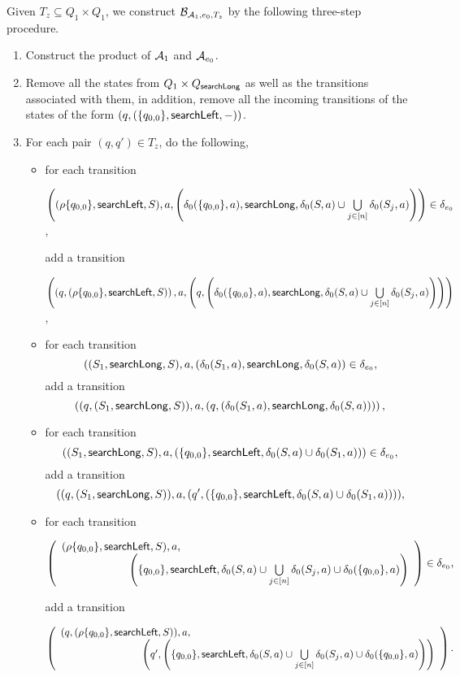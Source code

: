 Given $T_z \subseteq Q_1 \times Q_1$, we construct $\mathcal{B}_{\mathcal{A}_1, e_0,  T_{z}}$ by  the following three-step procedure.
\begin{enumerate}
\item Construct the product of $\mathcal{A}_1$ and $\mathcal{A}_{e_0}$. 

\item Remove all the states from $Q_1 \times Q_{\mathsf{searchLong}}$ as well as the transitions associated with them, in addition, remove all the incoming transitions of the states of the form $(q, (\{q_{0,0}\}, \mathsf{searchLeft},-))$.

\item For each pair $(q,q') \in T_{z}$, do the following,
\begin{itemize}
\item for each transition

$\left((\rho \{q_{0,0}\}, \mathsf{searchLeft}, S), a, \left(\delta_0(\{q_{0,0}\}, a), \mathsf{searchLong}, \delta_0(S, a) \cup \bigcup \limits_{j \in [n]} \delta_0(S_j, a) \right) \right) \in \delta_{e_0}$,

add a transition

$\left( \left(q, (\rho \{q_{0,0}\}, \mathsf{searchLeft}, S) \right), a, \left(q, \left(\delta_0(\{q_{0,0}\}, a), \mathsf{searchLong}, \delta_0(S, a) \cup \bigcup \limits_{j \in [n]} \delta_0(S_j, a) \right) \right) \right)$,

%
\item for each transition
		$$((S_1, \mathsf{searchLong}, S), a, (\delta_0(S_1,a), \mathsf{searchLong}, \delta_0(S,a)) \in \delta_{e_0},$$
add a transition 
$$\left((q, (S_1, \mathsf{searchLong}, S)), a, (q, (\delta_0(S_1,a), \mathsf{searchLong}, \delta_0(S,a))) \right),$$
%
\item for each transition
		$$((S_1, \mathsf{searchLong}, S), a, (\{q_{0,0}\}, \mathsf{searchLeft}, \delta_0(S,a) \cup \delta_0(S_1,a))) \in \delta_{e_0},$$
add a transition
		$$((q, (S_1, \mathsf{searchLong}, S)), a, (q', (\{q_{0,0}\}, \mathsf{searchLeft}, \delta_0(S,a) \cup \delta_0(S_1,a)))),$$
%
\item for each transition

\medskip

		$\left(
		\begin{array}{l l}
		(\rho \{q_{0,0}\}, \searchleft, S), a, &\\
		& \hspace{-2cm} \left(\{q_{0,0}\}, \searchleft, \delta_0(S,a) \cup \bigcup \limits_{j \in [n]} \delta_0(S_j, a) \cup \delta_0(\{q_{0,0}\}, a) \right)
		\end{array}
		\right) \in \delta_{e_0},$

\medskip

add a transition

\medskip
		$\left(
		\begin{array}{l l}
		(q, (\rho \{q_{0,0}\}, \searchleft, S)), a, &\\
		& \hspace{-2cm} \left(q', \left(\{q_{0,0}\}, \searchleft, \delta_0(S,a) \cup \bigcup \limits_{j \in [n]} \delta_0(S_j, a) \cup \delta_0(\{q_{0,0}\}, a) \right)\right)
		\end{array}
		\right).$
\medskip

\end{itemize}
\end{enumerate}

